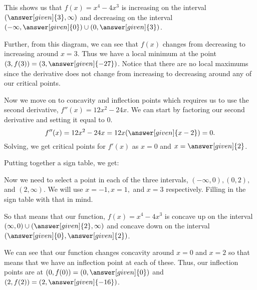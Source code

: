 \documentclass{ximera}
\begin{document}
\begin{example}
\begin{explanation}
\begin{figure}[h!]
    \centering
 

\end{figure}

This shows us that $f(x)=x^4-4x^3$ is increasing on the interval $(\answer[given]{3},\infty)$ and decreasing on the interval $(-\infty,\answer[given]{0})\cup(0,\answer[given]{3})$.

Further, from this diagram, we can see that $f(x)$ changes from decreasing to increasing around $x=3$. Thus we have a local minimum at the point $(3,f(3))=(3,\answer[given]{-27})$. Notice that there are no local maximums since the derivative does not change from increasing to decreasing around any of our critical points.

Now we move on to concavity and inflection points which requires us to use the second derivative, $f''(x)=12x^2-24x$. We can start by factoring our second derivative and setting it equal to 0.
\[f''(x)=12x^2-24x=12x(\answer[given]{x-2})=0.\]
Solving, we get critical points for $f'(x)$ as $x=0$ and $x=\answer[given]{2}$.

Putting together a sign table, we get:
\begin{figure}[h!]
    \centering
{}
\end{figure}
Now we need to select a point in each of the three intervals, $(-\infty,0), (0,2),$ and $(2,\infty)$. We will use $x=-1, x=1,$ and $x=3$ respectively. Filling in the sign table with that in mind.
\begin{figure}[h!]
    \centering
{}
\end{figure}
So that means that our function, $f(x)=x^4-4x^3$ is concave up on the interval $(\infty,0)\cup(\answer[given]{2},\infty)$ and concave down on the interval $(\answer[given]{0}, \answer[given]{2})$.

We can see that our function changes concavity around $x=0$ and $x=2$ so that means that we have an inflection point at each of these. Thus, our inflection points are at $(0,f(0))=(0,\answer[given]{0})$ and $(2,f(2))=(2,\answer[given]{-16})$.
\end{explanation}
\end{example}
\end{document}
